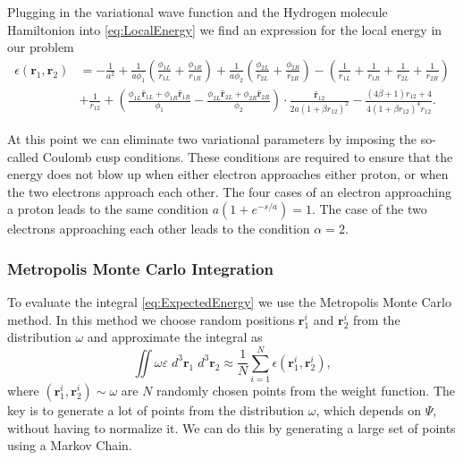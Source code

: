 \documentclass[twoside]{article}
\newcommand{\bfr}{\ensuremath{\mathbf{r}}}
\begin{document}
Plugging in the variational wave function and the Hydrogen molecule Hamiltonion into \eqref{eq:LocalEnergy} we find an expression for the local energy in our problem
\begin{equation}
\begin{split}
\epsilon(\bfr_1,\bfr_2) &= 
-\frac{1}{a^2} 
+ \frac{1}{a\phi_1} \left(\frac{\phi_{1L}}{r_{1L}} + \frac{\phi_{1R}}{r_{1R}}\right) 
+ \frac{1}{a\phi_2} \left(\frac{\phi_{2L}}{r_{2L}} + \frac{\phi_{2R}}{r_{2R}}\right)
- \left( \frac{1}{r_{1L}}+\frac{1}{r_{1R}}+\frac{1}{r_{2L}}+\frac{1}{r_{2R}} \right) \\
&+ \frac{1}{r_{12}} 
+ \left( \frac{\phi_{1L}\hat{\bfr}_{1L} + \phi_{1R}\hat{\bfr}_{1R}}{\phi_1} - \frac{\phi_{2L}\hat{\bfr}_{2L} + \phi_{2R}\hat{\bfr}_{2R}}{\phi_2} \right) \cdot \frac{\hat{\bfr}_{12}}{2a(1+\beta r_{12})^2} 
- \frac{(4\beta+1)r_{12}+4}{4(1+\beta r_{12})^4 r_{12}}. 
\end{split}
\end{equation}

At this point we can eliminate two variational parameters by imposing the so-called Coulomb cusp conditions. These conditions are required to ensure that the energy does not blow up when either electron approaches either proton, or when the two electrons approach each other. The four cases of an electron approaching a proton leads to the same condition $a(1+e^{-s/a}) = 1$. The case of the two electrons approaching each other leads to the condition $\alpha = 2$.

\subsubsection*{Metropolis Monte Carlo Integration}
To evaluate the integral \eqref{eq:ExpectedEnergy} we use the Metropolis Monte Carlo method. In this method we choose random positions $\bfr_1^i$ and $\bfr_2^i$ from the distribution $\omega$ and approximate the integral as
\begin{equation}
\iint \omega \varepsilon \; d^3\bfr_1 \; d^3\bfr_2 \approx \frac{1}{N} \sum_{i=1}^N \epsilon(\bfr_1^i,\bfr_2^i),
\end{equation}
where $(\bfr_1^i,\bfr_2^i) \sim \omega$ are $N$ randomly chosen points from the weight function. The key is to generate a lot of points from the distribution $\omega$, which depends on $\Psi$, without having to normalize it. We can do this by generating a large set of points using a Markov Chain.

\end{document}
